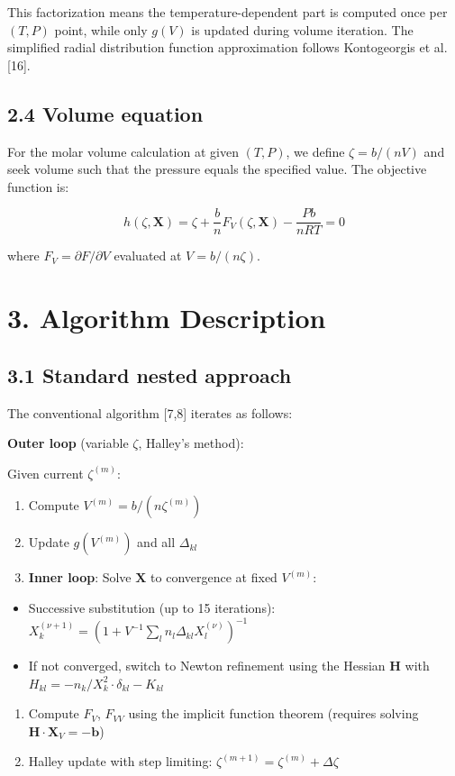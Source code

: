 \documentclass[review,3p]{elsarticle}
\begin{document}
This factorization means the temperature-dependent part is computed once per $(T, P)$ point, while only $g(V)$ is updated during volume iteration. The simplified radial distribution function approximation follows Kontogeorgis et al. [16].

\subsection{2.4 Volume equation}

For the molar volume calculation at given $(T, P)$, we define $\zeta = b/(nV)$ and seek volume such that the pressure equals the specified value. The objective function is:

\begin{equation}

h(\zeta, \mathbf{X}) = \zeta + \frac{b}{n} F_V(\zeta, \mathbf{X}) - \frac{Pb}{nRT} = 0

\end{equation}

where $F_V = \partial F / \partial V$ evaluated at $V = b/(n\zeta)$.


\section{3. Algorithm Description}



\subsection{3.1 Standard nested approach}

The conventional algorithm [7,8] iterates as follows:

\textbf{Outer loop} (variable $\zeta$, Halley's method):

Given current $\zeta^{(m)}$:

\begin{enumerate}
  \item Compute $V^{(m)} = b/(n\zeta^{(m)})$
  \item Update $g(V^{(m)})$ and all $\Delta_{kl}$
  \item \textbf{Inner loop}: Solve $\mathbf{X}$ to convergence at fixed $V^{(m)}$:
\end{enumerate}
\begin{itemize}
  \item Successive substitution (up to 15 iterations): $X_k^{(\nu+1)} = \left(1 + V^{-1}\sum_l n_l \Delta_{kl} X_l^{(\nu)}\right)^{-1}$
  \item If not converged, switch to Newton refinement using the Hessian $\mathbf{H}$ with $H_{kl} = -n_k/X_k^2 \cdot \delta_{kl} - K_{kl}$
\end{itemize}
\begin{enumerate}
  \item Compute $F_V$, $F_{VV}$ using the implicit function theorem (requires solving $\mathbf{H} \cdot \mathbf{X}_V = -\mathbf{b}$)
  \item Halley update with step limiting: $\zeta^{(m+1)} = \zeta^{(m)} + \Delta\zeta$
\end{enumerate}
\end{document}
